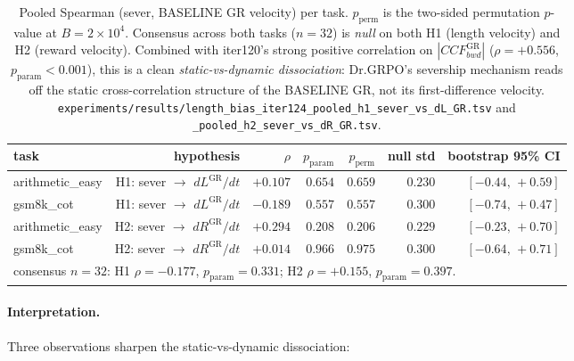 \begin{table}[t]
\centering
\small
\setlength{\tabcolsep}{5pt}
\begin{tabular}{l r r r r r r}
\hline
task & hypothesis & $\rho$ & $p_{\mathrm{param}}$ &
$p_{\mathrm{perm}}$ & null std & bootstrap 95\% CI \\
\hline
arithmetic\_easy & H1: sever $\to$ $dL^{\mathrm{GR}}/dt$ & $+0.107$ & $0.654$ &
$0.659$ & $0.230$ & $[-0.44,\,+0.59]$ \\
gsm8k\_cot       & H1: sever $\to$ $dL^{\mathrm{GR}}/dt$ & $-0.189$ & $0.557$ &
$0.557$ & $0.300$ & $[-0.74,\,+0.47]$ \\
arithmetic\_easy & H2: sever $\to$ $dR^{\mathrm{GR}}/dt$ & $+0.294$ & $0.208$ &
$0.206$ & $0.229$ & $[-0.23,\,+0.70]$ \\
gsm8k\_cot       & H2: sever $\to$ $dR^{\mathrm{GR}}/dt$ & $+0.014$ & $0.966$ &
$0.975$ & $0.300$ & $[-0.64,\,+0.71]$ \\
\hline
\multicolumn{7}{l}{consensus $n{=}32$: H1 $\rho=-0.177$, $p_{\mathrm{param}}{=}0.331$; H2 $\rho=+0.155$, $p_{\mathrm{param}}{=}0.397$.}
\end{tabular}
\caption{Pooled Spearman (sever, BASELINE GR velocity) per task.
$p_{\mathrm{perm}}$ is the two-sided permutation $p$-value at
$B{=}2{\times}10^{4}$.  Consensus across both tasks ($n{=}32$) is
\emph{null} on both H1 (length velocity) and H2 (reward velocity).
Combined with iter120's strong positive correlation on
$|CCF_{bwd}^{\mathrm{GR}}|$ ($\rho=+0.556$, $p_{\mathrm{param}}{<}0.001$),
this is a clean \emph{static-vs-dynamic dissociation}: Dr.GRPO's
severship mechanism reads off the static cross-correlation
structure of the BASELINE GR, not its first-difference velocity.
\texttt{experiments/results/length\_bias\_iter124\_pooled\_h1\_sever\_vs\_dL\_GR.tsv}
and \texttt{\_pooled\_h2\_sever\_vs\_dR\_GR.tsv}.}
\label{tab:length-bias-iter124-pooled}
\end{table}

\paragraph{Interpretation.}
Three observations sharpen the static-vs-dynamic dissociation:

